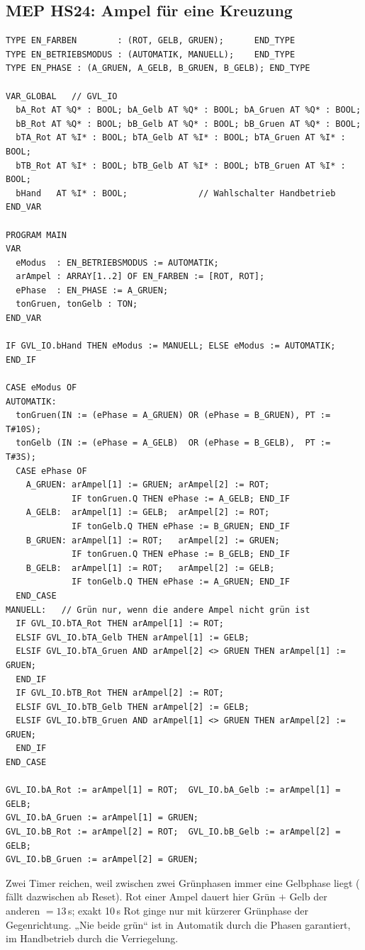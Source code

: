 \subsection{MEP HS24: Ampel für eine Kreuzung}
\label{bsp:ampel}
\begin{lstlisting}
TYPE EN_FARBEN        : (ROT, GELB, GRUEN);      END_TYPE
TYPE EN_BETRIEBSMODUS : (AUTOMATIK, MANUELL);    END_TYPE
TYPE EN_PHASE : (A_GRUEN, A_GELB, B_GRUEN, B_GELB); END_TYPE

VAR_GLOBAL   // GVL_IO
  bA_Rot AT %Q* : BOOL; bA_Gelb AT %Q* : BOOL; bA_Gruen AT %Q* : BOOL;
  bB_Rot AT %Q* : BOOL; bB_Gelb AT %Q* : BOOL; bB_Gruen AT %Q* : BOOL;
  bTA_Rot AT %I* : BOOL; bTA_Gelb AT %I* : BOOL; bTA_Gruen AT %I* : BOOL;
  bTB_Rot AT %I* : BOOL; bTB_Gelb AT %I* : BOOL; bTB_Gruen AT %I* : BOOL;
  bHand   AT %I* : BOOL;              // Wahlschalter Handbetrieb
END_VAR

PROGRAM MAIN
VAR
  eModus  : EN_BETRIEBSMODUS := AUTOMATIK;
  arAmpel : ARRAY[1..2] OF EN_FARBEN := [ROT, ROT];
  ePhase  : EN_PHASE := A_GRUEN;
  tonGruen, tonGelb : TON;
END_VAR

IF GVL_IO.bHand THEN eModus := MANUELL; ELSE eModus := AUTOMATIK; END_IF

CASE eModus OF
AUTOMATIK:
  tonGruen(IN := (ePhase = A_GRUEN) OR (ePhase = B_GRUEN), PT := T#10S);
  tonGelb (IN := (ePhase = A_GELB)  OR (ePhase = B_GELB),  PT := T#3S);
  CASE ePhase OF
    A_GRUEN: arAmpel[1] := GRUEN; arAmpel[2] := ROT;
             IF tonGruen.Q THEN ePhase := A_GELB; END_IF
    A_GELB:  arAmpel[1] := GELB;  arAmpel[2] := ROT;
             IF tonGelb.Q THEN ePhase := B_GRUEN; END_IF
    B_GRUEN: arAmpel[1] := ROT;   arAmpel[2] := GRUEN;
             IF tonGruen.Q THEN ePhase := B_GELB; END_IF
    B_GELB:  arAmpel[1] := ROT;   arAmpel[2] := GELB;
             IF tonGelb.Q THEN ePhase := A_GRUEN; END_IF
  END_CASE
MANUELL:   // Grün nur, wenn die andere Ampel nicht grün ist
  IF GVL_IO.bTA_Rot THEN arAmpel[1] := ROT;
  ELSIF GVL_IO.bTA_Gelb THEN arAmpel[1] := GELB;
  ELSIF GVL_IO.bTA_Gruen AND arAmpel[2] <> GRUEN THEN arAmpel[1] := GRUEN;
  END_IF
  IF GVL_IO.bTB_Rot THEN arAmpel[2] := ROT;
  ELSIF GVL_IO.bTB_Gelb THEN arAmpel[2] := GELB;
  ELSIF GVL_IO.bTB_Gruen AND arAmpel[1] <> GRUEN THEN arAmpel[2] := GRUEN;
  END_IF
END_CASE

GVL_IO.bA_Rot := arAmpel[1] = ROT;  GVL_IO.bA_Gelb := arAmpel[1] = GELB;
GVL_IO.bA_Gruen := arAmpel[1] = GRUEN;
GVL_IO.bB_Rot := arAmpel[2] = ROT;  GVL_IO.bB_Gelb := arAmpel[2] = GELB;
GVL_IO.bB_Gruen := arAmpel[2] = GRUEN;
\end{lstlisting}
\begin{falle}
Zwei Timer reichen, weil zwischen zwei Grünphasen immer eine Gelbphase
liegt ( fällt dazwischen ab \ra Reset). Rot einer Ampel dauert hier
Grün $+$ Gelb der anderen $=13$\,s; exakt 10\,s Rot ginge nur mit
kürzerer Grünphase der Gegenrichtung. „Nie beide grün“ ist in Automatik
durch die Phasen garantiert, im Handbetrieb durch die Verriegelung.
\end{falle}

